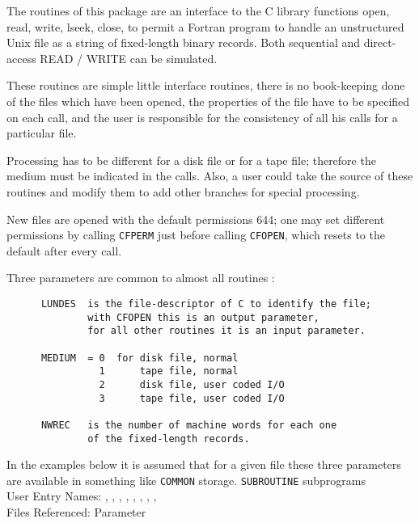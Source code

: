                               
          
\Submitter{}                                 
The routines of this package are an interface to the
C library functions open, read, write, lseek, close,
to permit a Fortran program to handle an unstructured
Unix file as a string of fixed-length binary records.
Both sequential and direct-access READ / WRITE can be simulated.
 
These routines are simple little interface routines,
there is no book-keeping done of the files which have been
opened, the properties of the file have to be specified
on each call, and the user is responsible for the consistency
of all his calls for a particular file.
 
Processing has to be different for a disk file or for a tape file;
therefore the medium must be indicated in the calls. Also, a user
could take the source of these routines and modify them to add other
branches for special processing.
 
New files are opened with the default permissions 644;
one may set different permissions by calling {\tt CFPERM}
just before calling {\tt CFOPEN}, which resets to the
default after every call.
 
Three parameters are common to almost all routines :
\begin{verbatim}
      LUNDES  is the file-descriptor of C to identify the file;
              with CFOPEN this is an output parameter,
              for all other routines it is an input parameter.
 
      MEDIUM  = 0  for disk file, normal
                1      tape file, normal
                2      disk file, user coded I/O
                3      tape file, user coded I/O
 
      NWREC   is the number of machine words for each one
              of the fixed-length records.
\end{verbatim}
In the examples below it is assumed that for a given file these
three parameters are available in something like {\tt COMMON} storage.
\Structure
{\tt SUBROUTINE} subprograms \\
User Entry Names:
, , ,
, , , ,
,  \\
Files Referenced: Parameter
 
